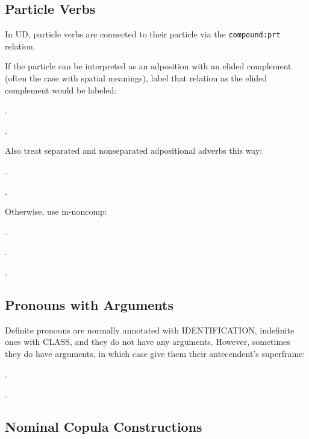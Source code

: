 \documentclass[a4paper]{article}
\newcommand{\fr}[1]{\textsf{#1}}
\newcommand{\rl}[1]{\textsf{#1}}
\begin{document}
\newpage\subsection{Particle Verbs}

In UD, particle verbs are connected to their particle via the
\texttt{compound:prt} relation.

If the particle can be interpreted as an adposition with an elided complement
(often the case with spatial meanings), label that relation as the elided
complement would be labeled:

\ex.

\ex.

Also treat separated and nonseparated adpositional adverbs this way:

\ex.

\ex.

Otherwise, use \rl{m-noncomp}:

\ex.

\ex.

\ex.


\newpage\subsection{Pronouns with Arguments}

Definite pronouns are normally annotated with \fr{IDENTIFICATION}, indefinite
ones with \fr{CLASS}, and they do not have any arguments. However, sometimes
they do have arguments, in which case give them their antecendent's superframe:

\ex.

\ex.


\newpage\subsection{Nominal Copula Constructions}
\end{document}
